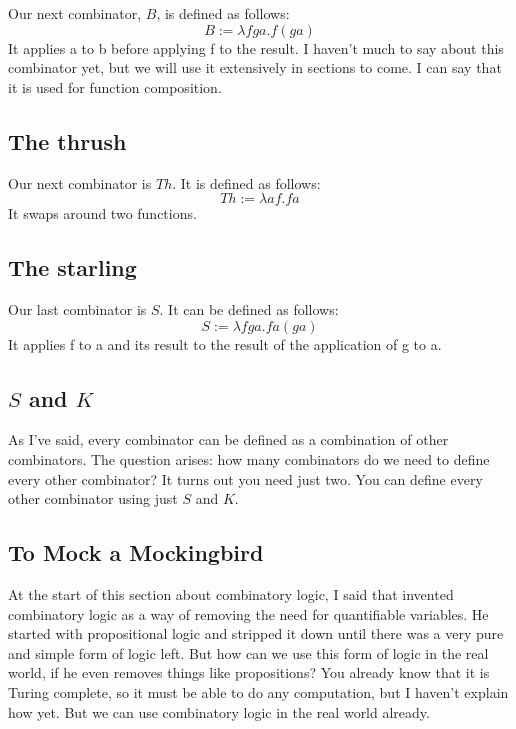 \documentclass[11pt]{book}
\begin{document}
Our next combinator, \(B\), is defined as follows:
\[B:=\lambda fga.f(ga)\]
It applies a to b before applying f to the result. I haven't much to say about
this combinator yet, but we will use it extensively in sections to come. I can
say that it is used for function composition. %

\subsection{The thrush}

Our next combinator is \(Th\). It is defined as follows:
\[Th:=\lambda af.fa\]
It swaps around two functions.

\subsection{The starling}

Our last combinator is \(S\). It can be defined as follows:
\[S:=\lambda fga.fa(ga)\]
It applies f to a and its result to the result of the application of g to a.

\subsection{\(S\) and \(K\)}


As I've said, every combinator can be defined as a combination of other
combinators. The question arises: how many combinators do we need to define
every other combinator? It turns out you need just two. You can define every
other combinator using just \(S\) and \(K\).


\subsection{To Mock a Mockingbird}

At the start of this section about combinatory logic, I said that
\textcite{schonfinkel1924} invented combinatory logic as a way of removing the
need for quantifiable variables. He started with propositional logic and
stripped it down until there was a very pure and simple form of logic left. But
how can we use this form of logic in the real world, if he even removes things
like propositions? You already know that it is Turing complete, so it must be
able to do any computation, but I haven't explain how yet. But we can use
combinatory logic in the real world already.
\end{document}
